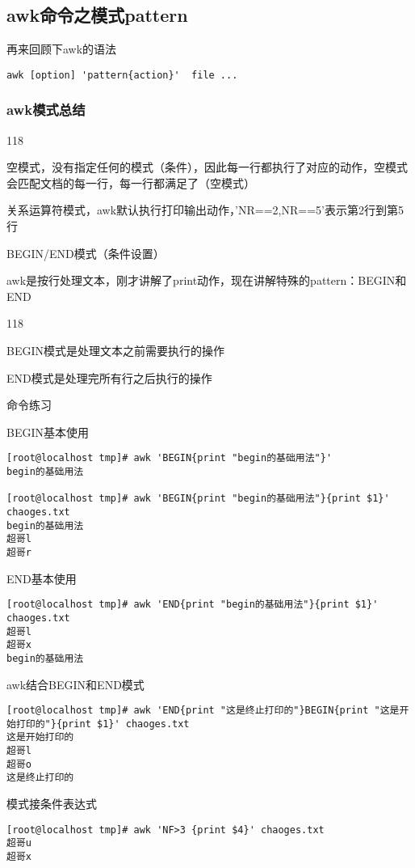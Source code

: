 \subsection{awk命令之模式pattern}
再来回顾下awk的语法
		\begin{lstlisting}[style=linux]
awk [option] 'pattern{action}'  file ...
\end{lstlisting}
\subsubsection{awk模式总结}
\begin{dinglist}{118}
	\item 空模式，没有指定任何的模式（条件），因此每一行都执行了对应的动作，空模式会匹配文档的每一行，每一行都满足了（空模式）	
	\item 关系运算符模式，awk默认执行打印输出动作，'NR==2,NR==5'表示第2行到第5行
	\item BEGIN/END模式（条件设置）
\end{dinglist}

awk是按行处理文本，刚才讲解了print动作，现在讲解特殊的pattern：BEGIN和END
\begin{dinglist}{118}
\item 	BEGIN模式是处理文本之前需要执行的操作
\item 	END模式是处理完所有行之后执行的操作
\end{dinglist}
\begin{ascolorbox10}{命令练习}
	\begin{ascboxJ}{BEGIN基本使用}
		\begin{lstlisting}[style=linux]
[root@localhost tmp]# awk 'BEGIN{print "begin的基础用法"}'
begin的基础用法

[root@localhost tmp]# awk 'BEGIN{print "begin的基础用法"}{print $1}' chaoges.txt
begin的基础用法
超哥l
超哥r
		\end{lstlisting}
	\end{ascboxJ}

	\begin{ascboxJ}{END基本使用}
		\begin{lstlisting}[style=linux]
[root@localhost tmp]# awk 'END{print "begin的基础用法"}{print $1}' chaoges.txt
超哥l
超哥x
begin的基础用法
\end{lstlisting}
\end{ascboxJ}

	\begin{ascboxJ}{awk结合BEGIN和END模式}
	\begin{lstlisting}[style=linux]
[root@localhost tmp]# awk 'END{print "这是终止打印的"}BEGIN{print "这是开始打印的"}{print $1}' chaoges.txt
这是开始打印的
超哥l
超哥o
这是终止打印的
	\end{lstlisting}
\end{ascboxJ}

\begin{ascboxJ}{模式接条件表达式}
	\begin{lstlisting}[style=linux]
[root@localhost tmp]# awk 'NF>3 {print $4}' chaoges.txt
超哥u
超哥x
	\end{lstlisting}
\end{ascboxJ}

\end{ascolorbox10}

